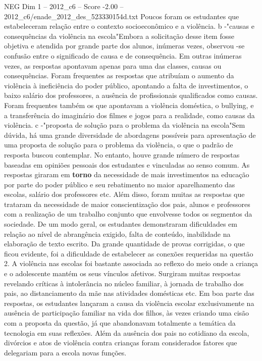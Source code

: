 \begin{textsample}{NEG Dim 1 – 2012\_c6 – Score -2.00 – 2012\_c6/enade\_2012\_des\_523330154d.txt}
Poucos foram os estudantes que estabeleceram relação entre o contexto socioeconômico e a violência. b -"causas e consequências da violência na escola"Embora a solicitação desse item fosse objetiva e atendida por grande parte dos alunos, inúmeras vezes, observou -se confusão entre o significado de causa e de consequência.
Em outras inúmeras vezes, as respostas apontavam apenas para uma das classes, causas ou consequências.
Foram frequentes as respostas que atribuíam o aumento da violência à ineficiência do poder público, apontando a falta de investimentos, o baixo salário dos professores, a ausência de profissionais qualificados como causas.
Foram frequentes também os que apontavam a violência doméstica, o bullying, e a transferência do imaginário dos filmes e jogos para a realidade, como causas da violência. c -"proposta de solução para o problema da violência na escola"Sem dúvida, há uma grande diversidade de abordagens possíveis para apresentação de uma proposta de solução para o problema da violência, o que o padrão de resposta buscou contemplar.
No entanto, houve grande número de respostas baseadas em opiniões pessoais dos estudantes e vinculadas ao senso comum.
As respostas giraram em \textbf{torno} da necessidade de mais investimentos na educação por parte do poder público e seu rebatimento no maior aparelhamento das escolas, salário dos professores etc.
Além disso, foram muitas as respostas que trataram da necessidade de maior conscientização dos pais, alunos e professores com a realização de um trabalho conjunto que envolvesse todos os segmentos da sociedade.
De um modo geral, os estudantes demonstraram dificuldades em relação ao nível de abrangência exigido, falta de conteúdo, inabilidade na elaboração de texto escrito.
Da grande quantidade de provas corrigidas, o que ficou evidente, foi a dificuldade de estabelecer as conexões requeridas na questão 2.
A violência nas escolas foi bastante associada ao reflexo do meio onde a criança e o adolescente mantém os seus vínculos afetivos.
Surgiram muitas respostas revelando críticas à intolerância no núcleo familiar, à jornada de trabalho dos pais, ao distanciamento da mãe nas atividades domésticas etc.
Em boa parte das respostas, os estudantes lançaram a causa da violência escolar exclusivamente na ausência de participação familiar na vida dos filhos, às vezes criando uma cisão com a proposta da questão, já que abandonavam totalmente a temática da tecnologia em suas reflexões.
Além da ausência dos pais no cotidiano da escola, divórcios e atos de violência contra crianças foram considerados fatores que delegariam para a escola novas funções.

\end{textsample}
